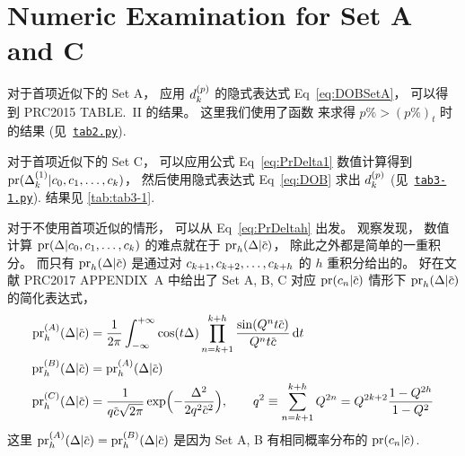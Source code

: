 
\section{Numeric Examination for Set A and C}
对于首项近似下的 Set A，
应用 $d_k^{(p)}$ 的隐式表达式 Eq~\eqref{eq:DOBSetA}，
可以得到 PRC2015 TABLE.~II 的结果。
这里我们使用了函数 
来求得 $p\%>(p\%)_t$ 时的结果
(见~\href{https://github.com/Dou-Meishi/bayesforerror/blob/master/code/tab2.py}{\texttt{tab2.py}}).

对于首项近似下的 Set C，
可以应用公式 Eq~\eqref{eq:PrDelta1} 数值计算得到 $\textrm{pr}(\Delta_k^{(1)}|
c_0,c_1,\ldots,c_k)$，
然后使用隐式表达式 Eq~\eqref{eq:DOB} 求出 $d_k^{(p)}$
(见~\href{https://github.com/Dou-Meishi/bayesforerror/blob/master/code/tab3-1.py}{\texttt{tab3-1.py}}).
结果见 \autoref{tab:tab3-1}.

对于不使用首项近似的情形，
可以从 Eq~\eqref{eq:PrDeltah} 出发。
观察发现，
数值计算 $\textrm{pr}(\Delta|c_0,c_1,\ldots,c_k)$ 的难点就在于
$\dmspr_h(\Delta|\dmscbar)$，
除此之外都是简单的一重积分。
而只有 $\dmspr_h(\Delta|\dmscbar)$ 是通过对 $c_{k+1},c_{k+2},\ldots,c_{k+h}$ 的 $h$ 重积分给出的。
好在文献 PRC2017 APPENDIX~A 中给出了 Set A, B, C 对应 $\dmspr(c_n|\dmscbar)$
情形下 $\dmspr_h(\Delta|\dmscbar)$ 的简化表达式，
\begin{equation}
  \label{eq:PrhABC}
  \begin{aligned}
    \dmspr_h^{(A)}(\Delta|\dmscbar) &=
    \frac{1}{2\pi}\int_{-\infty}^{+\infty}
    \cos(t\Delta) \prod_{n=k+1}^{k+h}
    \frac{\sin( Q^nt\dmscbar)}{ Q^nt\dmscbar}\dmsdif t\\
    \dmspr_h^{(B)}(\Delta|\dmscbar) &= \dmspr_h^{(A)}(\Delta|\dmscbar) \\
    \dmspr_h^{(C)}(\Delta|\dmscbar) &=
    \frac{1}{q\dmscbar\sqrt{2\pi}}\exp\Bigl(- \frac{
        \Delta^2}{2q^2\dmscbar^2}\Bigr),
    \qquad q^2\equiv\sum_{n=k+1}^{k+h}Q^{2n}
    = Q^{2k+2} \frac{1-Q^{2h}}{1-Q^2}
  \end{aligned}
\end{equation}
这里 $\dmspr_h^{(A)}(\Delta|\dmscbar)=\dmspr_h^{(B)}(\Delta|\dmscbar)$
是因为 Set A, B 有相同概率分布的 $\dmspr(c_n|\dmscbar)$.

